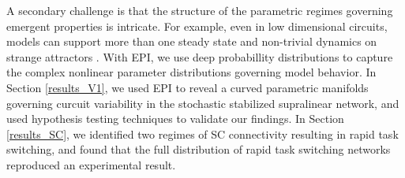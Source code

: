 \documentclass[11pt]{article}
\begin{document}
A secondary challenge is that the structure of the parametric regimes governing emergent properties is intricate.  
For example, even in low dimensional circuits, models can support more than one steady state \cite{kraynyukova2018stabilized} and non-trivial dynamics on strange attractors \cite{morrison2016diversity}.
With EPI, we use deep probabillity distributions to capture the complex nonlinear parameter distributions governing model behavior.
In Section \ref{results_V1}, we used EPI to reveal a curved parametric manifolds governing curcuit variability in the stochastic stabilized supralinear network, and used hypothesis testing techniques to validate our findings.
In Section \ref{results_SC}, we identified two regimes of SC connectivity resulting in rapid task switching, and found that the full distribution of rapid task switching networks reproduced an experimental result.


\end{document}

